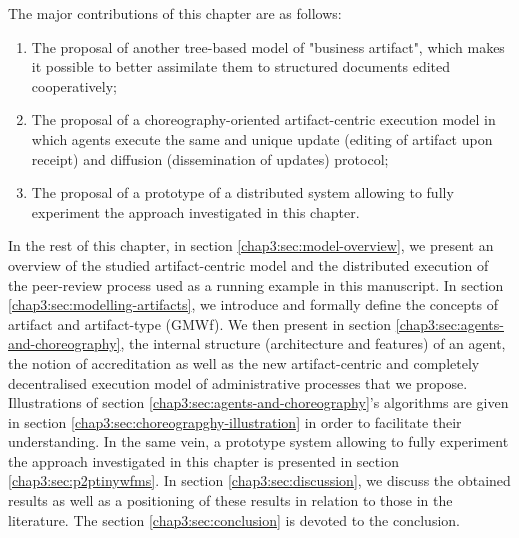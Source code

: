 \noindent The major contributions of this chapter are as follows:	
\begin{enumerate}
\item The proposal of another tree-based model of "business artifact", which makes it possible to better assimilate them to structured documents edited cooperatively;

\item The proposal of a choreography-oriented artifact-centric execution model in which agents execute the same and unique update (editing of artifact upon receipt) and diffusion (dissemination of updates) protocol;

\item The proposal of a prototype of a distributed system allowing to fully experiment the approach investigated in this chapter.
\end{enumerate}
  
In the rest of this chapter, in section \ref{chap3:sec:model-overview}, we present an overview of the studied artifact-centric model and the distributed execution of the peer-review process used as a running example in this manuscript. In section \ref{chap3:sec:modelling-artifacts}, we introduce and formally define the concepts of artifact and artifact-type (GMWf). We then present in section \ref{chap3:sec:agents-and-choreography}, the internal structure (architecture and features) of an agent, the notion of accreditation as well as the new artifact-centric and completely decentralised execution model of administrative processes that we propose. Illustrations of section \ref{chap3:sec:agents-and-choreography}'s algorithms are given in section \ref{chap3:sec:choreograpghy-illustration} in order to facilitate their understanding. In the same vein, a prototype system allowing to fully experiment the approach investigated in this chapter is presented in section \ref{chap3:sec:p2ptinywfms}. In section \ref{chap3:sec:discussion}, we discuss the obtained results as well as a positioning of these results in relation to those in the literature. The section \ref{chap3:sec:conclusion} is devoted to the conclusion.

